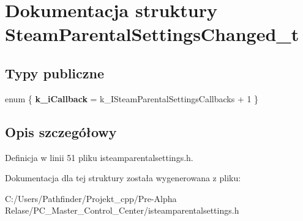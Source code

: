 \hypertarget{struct_steam_parental_settings_changed__t}{}\section{Dokumentacja struktury Steam\+Parental\+Settings\+Changed\+\_\+t}
\label{struct_steam_parental_settings_changed__t}
\subsection*{Typy publiczne}
\begin{DoxyCompactItemize}
\item 
\mbox{\label{struct_steam_parental_settings_changed__t_abe6ed6295adead91a1b149dd19701449}} 
enum \{ {\bfseries k\+\_\+i\+Callback} = k\+\_\+\+I\+Steam\+Parental\+Settings\+Callbacks + 1
 \}
\end{DoxyCompactItemize}


\subsection{Opis szczegółowy}


Definicja w linii 51 pliku isteamparentalsettings.\+h.



Dokumentacja dla tej struktury została wygenerowana z pliku\+:\begin{DoxyCompactItemize}
\item 
C\+:/\+Users/\+Pathfinder/\+Projekt\+\_\+cpp/\+Pre-\/\+Alpha Relase/\+P\+C\+\_\+\+Master\+\_\+\+Control\+\_\+\+Center/isteamparentalsettings.\+h\end{DoxyCompactItemize}
